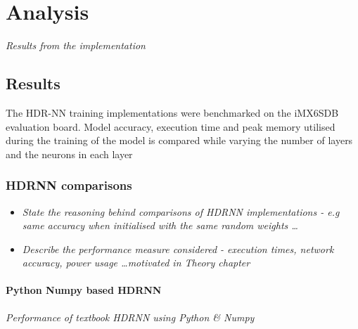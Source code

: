 \part{Analysis}
\textit{Results from the implementation}

\chapter{Results}

The HDR-NN training implementations were benchmarked on the iMX6SDB evaluation board. Model accuracy, execution time and peak memory utilised during the training of the model is compared while varying the number of layers and the neurons in each layer

\section{HDRNN comparisons}
\begin{itemize}
	\item \textit{State the reasoning behind comparisons of HDRNN implementations - e.g same accuracy when initialised with the same random weights \dots}
	\item \textit{Describe the performance measure considered - execution times, network accuracy, power usage \dots motivated in Theory chapter}

\end{itemize}

\subsection[Python - Numpy]{Python Numpy based HDRNN}
\textit{Performance of textbook HDRNN using Python \& Numpy}

